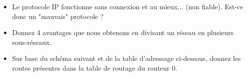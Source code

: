 \documentclass[a4paper]{article}
\begin{document}
\begin{itemize}
    \item Le protocole IP fonctionne sans connexion et au mieux... (non fiable). Est-ce donc un "mauvais" protocole ?
    \item Donnez 4 avantages que nous obtenons en divisant un réseau en plusieurs sous-réseaux.
    \item Sur base du schéma suivant et de la table d’adressage ci-dessous, donnez les routes présentes dans la table de routage du routeur 0.
    \begin{center}
\end{center}
\end{itemize}
\end{document}
